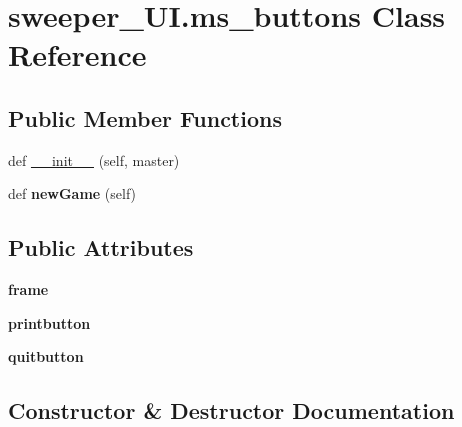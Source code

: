 \hypertarget{classsweeper___u_i_1_1ms__buttons}{}\section{sweeper\+\_\+\+U\+I.\+ms\+\_\+buttons Class Reference}
\label{classsweeper___u_i_1_1ms__buttons}
\subsection*{Public Member Functions}
\begin{DoxyCompactItemize}
\item 
def \hyperlink{classsweeper___u_i_1_1ms__buttons_a3d2640672406cad7e5dd9a4e6042c62b}{\+\_\+\+\_\+init\+\_\+\+\_\+} (self, master)
\item 
\mbox{\label{classsweeper___u_i_1_1ms__buttons_a316fd922551eda73ab09b9a0e23590e9}} 
def {\bfseries new\+Game} (self)
\end{DoxyCompactItemize}
\subsection*{Public Attributes}
\begin{DoxyCompactItemize}
\item 
\mbox{\label{classsweeper___u_i_1_1ms__buttons_ad62765731850af488602fbcac97959ef}} 
{\bfseries frame}
\item 
\mbox{\label{classsweeper___u_i_1_1ms__buttons_a158dc9ab51428b700dfa334e300cddd7}} 
{\bfseries printbutton}
\item 
\mbox{\label{classsweeper___u_i_1_1ms__buttons_a212c2a7c98335b7ce4209b9a8087e9fb}} 
{\bfseries quitbutton}
\end{DoxyCompactItemize}


\subsection{Constructor \& Destructor Documentation}
\mbox{\label{classsweeper___u_i_1_1ms__buttons_a3d2640672406cad7e5dd9a4e6042c62b}} 
